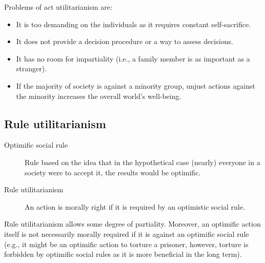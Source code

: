 \begin{remark}
    Problems of act utilitarianism are:
    \begin{itemize}
        \item It is too demanding on the individuals as it requires constant self-sacrifice.
        \item It does not provide a decision procedure or a way to assess decisions.
        \item It has no room for impartiality (i.e., a family member is as important as a stranger).
        \item If the majority of society is against a minority group, unjust actions against the minority increases the overall world's well-being.
    \end{itemize}
\end{remark}


\subsection{Rule utilitarianism}

\begin{description}
    \item[Optimific social rule] 
        Rule based on the idea that in the hypothetical case (nearly) everyone in a society were to accept it, the results would be optimific. 

    \item[Rule utilitarianism] 
        An action is morally right if it is required by an optimistic social rule.

\end{description}

\begin{remark}
    Rule utilitarianism allows some degree of partiality. Moreover, an optimific action itself is not necessarily morally required if it is against an optimific social rule (e.g., it might be an optimific action to torture a prisoner, however, torture is forbidden by optimific social rules as it is more beneficial in the long term).
\end{remark}